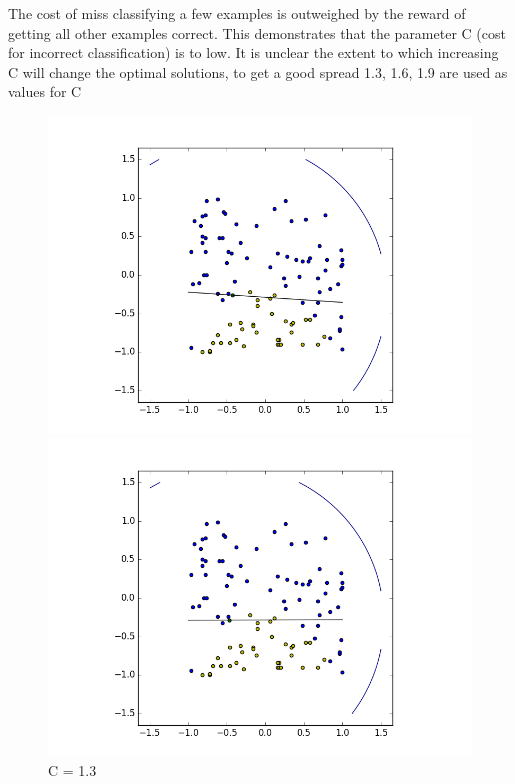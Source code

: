 \documentclass[notitlepage]{report}
\theoremstyle{definition}
\begin{document}
The cost of miss classifying a few examples is outweighed by the reward of getting all other examples correct. This demonstrates that the parameter C (cost for incorrect classification) is to low. It is unclear the extent to which increasing C will change the optimal solutions, to get a good spread 1.3, 1.6, 1.9 are used as values for C

\begin{figure}[H]
  \centering
  \begin{minipage}[b]{0.49\textwidth}
    \includegraphics[width=\textwidth]{BoundaryHunter-Attempt3-02.png}
    \caption{C = 1.3}
    \label{fig:boundaryhunter-l2-02}
  \end{minipage}
  \hfill
  \begin{minipage}[b]{0.49\textwidth}
    \includegraphics[width=\textwidth]{BoundaryHunter-Attempt3-03.png}

\end{minipage}
\end{figure}
\end{document}
